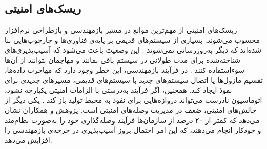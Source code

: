\subsection*{ریسک‌های امنیتی}
ریسک‌های امنیتی از مهم‌ترین موانع در مسیر بازمهندسی و بازطراحی نرم‌افزار محسوب می‌شوند. بسیاری از سیستم‌های قدیمی بر پایه‌ی فناوری‌ها و چارچوب‌هایی بنا شده‌اند که دیگر به‌روزرسانی نمی‌شوند \cite{integrity2023}. این وضعیت باعث می‌شود که آسیب‌پذیری‌های شناخته‌شده برای مدت طولانی در سیستم باقی بمانند و مهاجمان بتوانند از آن‌ها سوء‌استفاده کنند \cite{herodevs2024}. 
در فرآیند بازمهندسی، این خطر وجود دارد که مهاجرت داده‌ها، تقسیم ماژول‌ها یا اتصال سیستم‌های جدید با سیستم‌های قدیمی، مسیرهای جدیدی برای نفوذ ایجاد کند. همچنین، اگر فرآیند  به‌درستی با الزامات امنیتی یکپارچه نشود، اتوماسیون نادرست می‌تواند دروازه‌هایی برای نفوذ به محیط تولید باز کند \cite{atiba2025}. 
یکی دیگر از چالش‌های امنیتی، ضعف در مدیریت وصله‌های امنیتی است. پژوهش  و همکاران \cite{dissanayake2020} نشان می‌دهد که کمتر از ۲۰ درصد از سازمان‌ها فرآیند وصله‌گذاری خود را به‌صورت نظام‌مند و خودکار انجام می‌دهند، که این امر احتمال بروز آسیب‌پذیری در چرخه‌ی بازمهندسی را افزایش می‌دهد.

